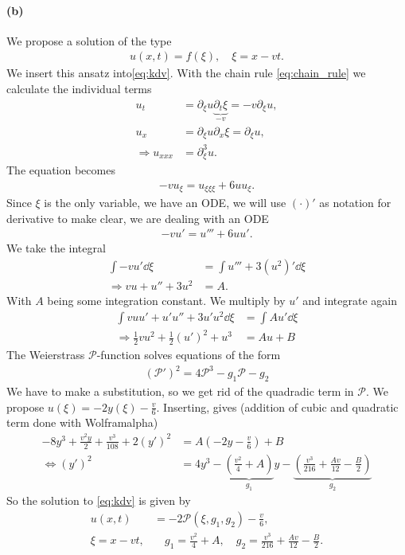 \paragraph{(b)}
We propose a solution of the type 
\begin{align}
u(x,t)=f(\xi),\quad \xi= x-vt.
\end{align}
We insert this ansatz into\cref{eq:kdv}. With the chain rule \cref{eq:chain_rule} we calculate the individual terms
\begin{align}
u_t &= \partial_\xi u \underbrace{\partial_t \xi}_{-v}=-v \partial_\xi u,\\
u_x &= \partial_\xi u \partial_x \xi = \partial_\xi u ,\\
\Rightarrow u _{xxx}&= \partial_{\xi}^3 u.
\end{align}
The equation becomes 
\begin{align}
-v u_\xi = u_{\xi\xi\xi} + 6 u u_\xi.
\end{align}
Since $\xi$ is the only variable, we have an ODE, we will use $(\cdot)'$ as notation for derivative to make clear, we are dealing with an ODE
\begin{align}
-v u' = u''' +6 uu'.\label{eq:4b_ode}
\end{align}
We take the integral
\begin{align}
\int -v u' \dd\xi &= \int u''' +3(u^2)' \dd\xi\\
\Rightarrow v u+u''+3u^2 &= A.
\end{align}
With $A$ being some integration constant.  We multiply by $u'$ and integrate again
\begin{align}
\int vuu' +u'u'' + 3u'u^2 \dd\xi&= \int Au' \dd\xi\\
\Rightarrow \frac 12 vu^2 + \frac 12 (u')^2  + u^3&= Au +B
\end{align}
The Weierstrass $\mathscr{P}$-function solves equations of the form
\begin{align}
(\mathscr{P}')^2 = 4\mathscr{P}^3-g_1\mathscr{P}-g_2
\end{align}
We have to make a substitution, so we get rid of the quadradic term in $\mathscr{P}$.
We propose $u(\xi)=-2y(\xi)-\frac v6$. Inserting, gives (addition of cubic and quadratic term done with Wolframalpha)
\begin{align}
-8y^3+\frac{v^2y}{2}+\frac{v^3}{108} +2(y')^2&=A\left(-2y-\frac v6\right) +B\\
\iff (y')^2 &= 4y^3-\underbrace{\left(\frac{v^2}{4}+A\right)}_{g_1}y - \underbrace{\left(\frac{v^3}{216} +\frac{Av}{12} - \frac B2\right)}_{g_2}
\end{align}
So the solution to \cref{eq:kdv} is given by
\begin{align}
u(x,t) &= -2\mathscr{P}(\xi,g_1,g_2) - \frac v6, \label{eq:sol_4b}\\
\xi = x-vt,& \quad g_1=\frac{v^2}{4}+A, \quad g_2=\frac{v^3}{216} +\frac{Av}{12} - \frac B2.
\end{align}
